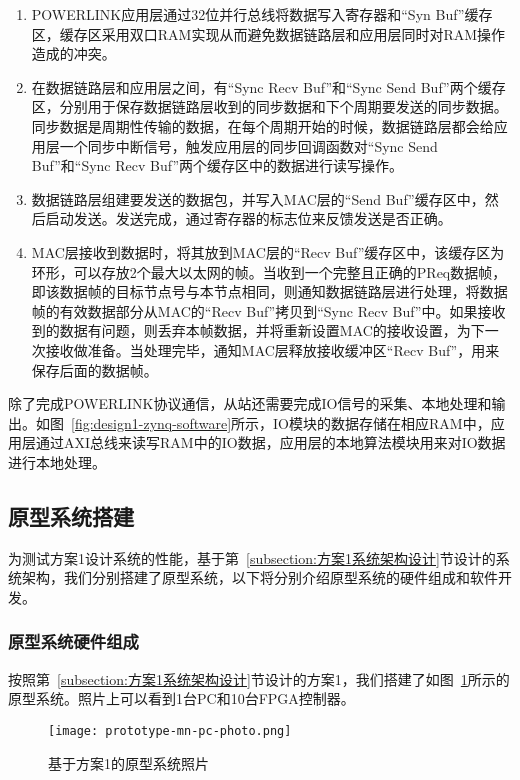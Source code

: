 \begin{enumerate}
  \item POWERLINK应用层通过32位并行总线将数据写入寄存器和“Syn Buf”缓存区，缓存区采用双口RAM实现从而避免数据链路层和应用层同时对RAM操作造成的冲突。

  \item 在数据链路层和应用层之间，有“Sync Recv Buf”和“Sync Send Buf”两个缓存区，分别用于保存数据链路层收到的同步数据和下个周期要发送的同步数据。同步数据是周期性传输的数据，在每个周期开始的时候，数据链路层都会给应用层一个同步中断信号，触发应用层的同步回调函数对“Sync Send Buf”和“Sync Recv Buf”两个缓存区中的数据进行读写操作。

  \item 数据链路层组建要发送的数据包，并写入MAC层的“Send Buf”缓存区中，然后启动发送。发送完成，通过寄存器的标志位来反馈发送是否正确。

  \item MAC层接收到数据时，将其放到MAC层的“Recv Buf”缓存区中，该缓存区为环形，可以存放2个最大以太网的帧。当收到一个完整且正确的PReq数据帧，即该数据帧的目标节点号与本节点相同，则通知数据链路层进行处理，将数据帧的有效数据部分从MAC的“Recv Buf”拷贝到“Sync Recv Buf”中。如果接收到的数据有问题，则丢弃本帧数据，并将重新设置MAC的接收设置，为下一次接收做准备。当处理完毕，通知MAC层释放接收缓冲区“Recv Buf”，用来保存后面的数据帧。
 \end{enumerate}

除了完成POWERLINK协议通信，从站还需要完成IO信号的采集、本地处理和输出。如图~\ref{fig:design1-zynq-software}所示，IO模块的数据存储在相应RAM中，应用层通过AXI总线来读写RAM中的IO数据，应用层的本地算法模块用来对IO数据进行本地处理。

\subsection{原型系统搭建}

为测试方案1设计系统的性能，基于第~\ref{subsection:方案1系统架构设计}节设计的系统架构，我们分别搭建了原型系统，以下将分别介绍原型系统的硬件组成和软件开发。

\subsubsection{原型系统硬件组成} 

按照第~\ref{subsection:方案1系统架构设计}节设计的方案1，我们搭建了如图~\ref{fig:prototype-mn-pc-photo}所示的原型系统。照片上可以看到1台PC和10台FPGA控制器。

\begin{figure}[!htb]
  \centering
  \texttt{[image: prototype-mn-pc-photo.png]}
  \caption{基于方案1的原型系统照片}
  \label{fig:prototype-mn-pc-photo}
\end{figure}

